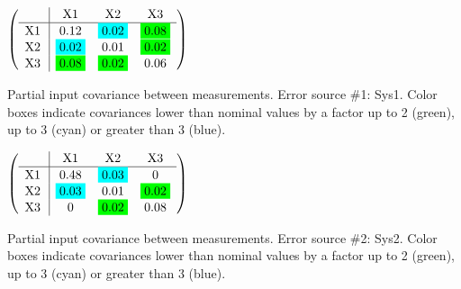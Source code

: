 \begin{table}[H]
\scriptsize
\begin{center}
\renewcommand{\arraystretch}{1.1}
\begin{math}\left(\begin{array}{c|ccc}
 & \mathrm{X1} & 
\mathrm{X2} & 
\mathrm{X3} \\
\hline
\mathrm{X1} \hspace*{2pt} &       0.12 &  \colorbox{Cyan1}{$      0.02$} &  \colorbox{Green1}{$      0.08$} \\
\mathrm{X2} \hspace*{2pt} &  \colorbox{Cyan1}{$      0.02$} &       0.01 &  \colorbox{Green1}{$      0.02$} \\
\mathrm{X3} \hspace*{2pt} &  \colorbox{Green1}{$      0.08$} &  \colorbox{Green1}{$      0.02$} &       0.06 \\
\end{array}\right)\end{math}
\caption{Partial input covariance between measurements. Error source \#1: Sys1. Color boxes indicate covariances lower than nominal values by a factor up to 2 (green), up to 3 (cyan) or greater than 3 (blue).}
\renewcommand{\arraystretch}{1}
\end{center}
\end{table}
\begin{table}[H]
\scriptsize
\begin{center}
\renewcommand{\arraystretch}{1.1}
\begin{math}\left(\begin{array}{c|ccc}
 & \mathrm{X1} & 
\mathrm{X2} & 
\mathrm{X3} \\
\hline
\mathrm{X1} \hspace*{2pt} &       0.48 &  \colorbox{Cyan1}{$      0.03$} &  0 \\
\mathrm{X2} \hspace*{2pt} &  \colorbox{Cyan1}{$      0.03$} &       0.01 &  \colorbox{Green1}{$      0.02$} \\
\mathrm{X3} \hspace*{2pt} &  0 &  \colorbox{Green1}{$      0.02$} &       0.08 \\
\end{array}\right)\end{math}
\caption{Partial input covariance between measurements. Error source \#2: Sys2. Color boxes indicate covariances lower than nominal values by a factor up to 2 (green), up to 3 (cyan) or greater than 3 (blue).}
\renewcommand{\arraystretch}{1}
\end{center}
\end{table}
